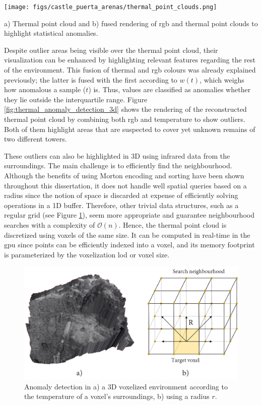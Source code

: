 \begin{marginfigure}[.2cm]
    \centering
    \texttt{[image: figs/castle\_puerta\_arenas/thermal\_point\_clouds.png]}
	\caption{a) Thermal point cloud and b) fused rendering of \acrshort{rgb} and thermal point clouds to highlight statistical anomalies.}
	\label{fig:thermal_anomaly_detection_3d}
\end{marginfigure}
Despite outlier areas being visible over the thermal point cloud, their visualization can be enhanced by highlighting relevant features regarding the rest of the environment. This fusion of thermal and \acrshort{rgb} colours was already explained previously; the latter is fused with the first according to $w(t)$, which weighs how anomalous a sample ($t$) is. Thus, values are classified as anomalies whether they lie outside the interquartile range. Figure \ref{fig:thermal_anomaly_detection_3d} shows the rendering of the reconstructed thermal point cloud by combining both \acrshort{rgb} and temperature to show outliers. Both of them highlight areas that are suspected to cover yet unknown remains of two different towers. 

These outliers can also be highlighted in 3D using infrared data from the surroundings. The main challenge is to efficiently find the neighbourhood. Although the benefits of using Morton encoding and sorting have been shown throughout this dissertation, it does not handle well spatial queries based on a radius since the notion of space is discarded at expense of efficiently solving operations in a 1D buffer. Therefore, other trivial data structures, such as a regular grid (see Figure \ref{fig:voxel_anomalies_scheme}), seem more appropriate and guarantee neighbourhood searches with a complexity of $\mathcal{O}(n)$. Hence, the thermal point cloud is discretized using voxels of the same size. It can be computed in real-time in the \acrshort{gpu} since points can be efficiently indexed into a voxel, and its memory footprint is parameterized by the voxelization \acrshort{lod} or voxel size.

\begin{figure}[ht]
    \centering
    \includegraphics[width=\linewidth]{figs/castle_puerta_arenas/voxel_anomalies.png}
	\caption{Anomaly detection in a) a 3D voxelized environment according to the temperature of a voxel's surroundings, b) using a radius $r$.}
	\label{fig:voxel_anomalies_scheme}
\end{figure}

